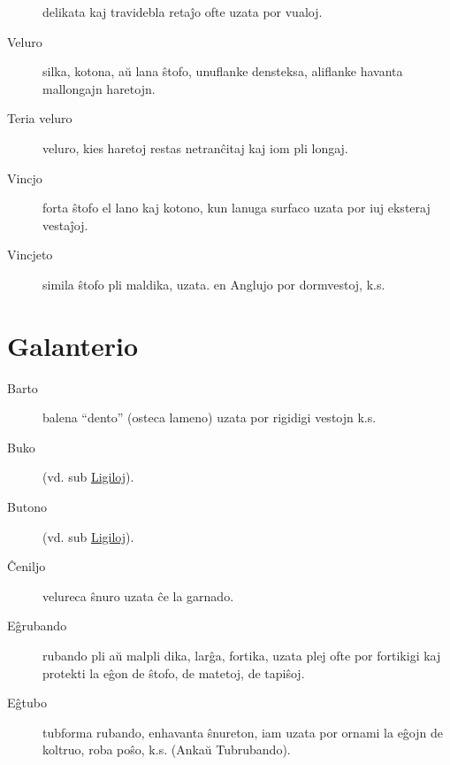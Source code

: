 \begin{description}
 delikata kaj travidebla retaĵo ofte uzata por vualoj.

\item[Veluro]

 silka, kotona, aŭ lana ŝtofo, unuflanke densteksa, aliflanke havanta mallongajn haretojn.

\item[\ast\space Teria veluro]

 veluro, kies haretoj restas netranĉitaj kaj iom pli longaj.

\item[\dagger\space Vincjo]

 forta ŝtofo el lano kaj kotono, kun lanuga surfaco uzata por iuj eksteraj vestaĵoj.

\item[\dagger\space Vincjeto]

 simila ŝtofo pli maldika, uzata. en Anglujo por dormvestoj, k.s.
\end{description}

\section[Galanterio]{Galanterio}
\hypertarget{Galanterio}{}
\label{Galanterio}


\begin{description}
\item[Barto]

 balena ``dento'' (osteca lameno) uzata por rigidigi vestojn k.s.

\item[Buko]

 (vd. sub \hyperlink{Ligoj}{Ligiloj}).

\item[Butono]

 (vd. sub \hyperlink{Ligoj}{Ligiloj}).

\item[\dagger\space Ĉeniljo]

 velureca ŝnuro uzata ĉe la garnado.

\item[Eĝrubando]

 rubando pli aŭ malpli dika, larĝa, fortika, uzata plej ofte por fortikigi kaj protekti la eĝon de ŝtofo, de matetoj, de tapiŝoj.

\item[Eĝtubo]

 tubforma rubando, enhavanta ŝnureton, iam uzata por ornami la eĝojn de koltruo, roba poŝo, k.s. (Ankaŭ Tubrubando).
\end{description}

